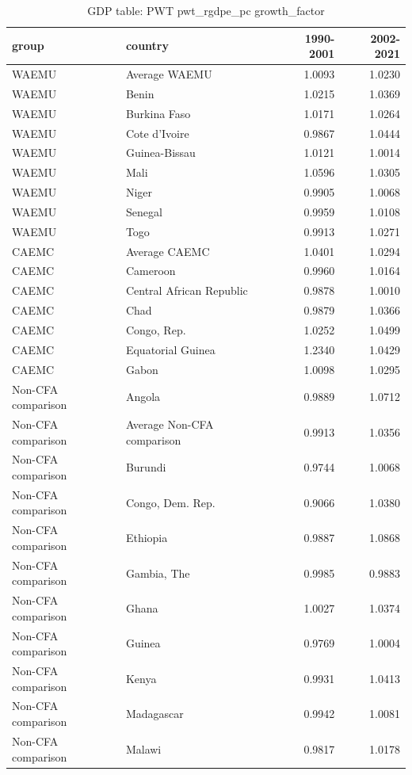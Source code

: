 \begin{table}

\caption{GDP table: PWT pwt_rgdpe_pc growth_factor}
\centering
\begin{tabular}[t]{llrr}
\toprule
group & country & 1990-2001 & 2002-2021\\
\midrule
WAEMU & Average WAEMU & 1.0093 & 1.0230\\
WAEMU & Benin & 1.0215 & 1.0369\\
WAEMU & Burkina Faso & 1.0171 & 1.0264\\
WAEMU & Cote d'Ivoire & 0.9867 & 1.0444\\
WAEMU & Guinea-Bissau & 1.0121 & 1.0014\\
\addlinespace
WAEMU & Mali & 1.0596 & 1.0305\\
WAEMU & Niger & 0.9905 & 1.0068\\
WAEMU & Senegal & 0.9959 & 1.0108\\
WAEMU & Togo & 0.9913 & 1.0271\\
CAEMC & Average CAEMC & 1.0401 & 1.0294\\
\addlinespace
CAEMC & Cameroon & 0.9960 & 1.0164\\
CAEMC & Central African Republic & 0.9878 & 1.0010\\
CAEMC & Chad & 0.9879 & 1.0366\\
CAEMC & Congo, Rep. & 1.0252 & 1.0499\\
CAEMC & Equatorial Guinea & 1.2340 & 1.0429\\
\addlinespace
CAEMC & Gabon & 1.0098 & 1.0295\\
Non-CFA comparison & Angola & 0.9889 & 1.0712\\
Non-CFA comparison & Average Non-CFA comparison & 0.9913 & 1.0356\\
Non-CFA comparison & Burundi & 0.9744 & 1.0068\\
Non-CFA comparison & Congo, Dem. Rep. & 0.9066 & 1.0380\\
\addlinespace
Non-CFA comparison & Ethiopia & 0.9887 & 1.0868\\
Non-CFA comparison & Gambia, The & 0.9985 & 0.9883\\
Non-CFA comparison & Ghana & 1.0027 & 1.0374\\
Non-CFA comparison & Guinea & 0.9769 & 1.0004\\
Non-CFA comparison & Kenya & 0.9931 & 1.0413\\
\addlinespace
Non-CFA comparison & Madagascar & 0.9942 & 1.0081\\
Non-CFA comparison & Malawi & 0.9817 & 1.0178\\

\end{tabular}
\end{table}
